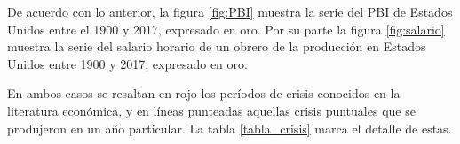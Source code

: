 \documentclass[a4paper]{article}
\begin{document}
%

De acuerdo con lo anterior, la figura \ref{fig:PBI} muestra la serie del PBI de Estados Unidos entre el 1900 y 2017, expresado en oro. Por su parte la figura \ref{fig:salario} muestra la serie del salario horario de un obrero de la producción en Estados Unidos entre 1900 y 2017, expresado en oro.

 En ambos casos se resaltan en rojo los períodos de crisis conocidos en la literatura económica, y en líneas punteadas aquellas crisis puntuales que se produjeron en un año particular. La tabla \ref{tabla_crisis} marca el detalle de estas.
\end{document}

